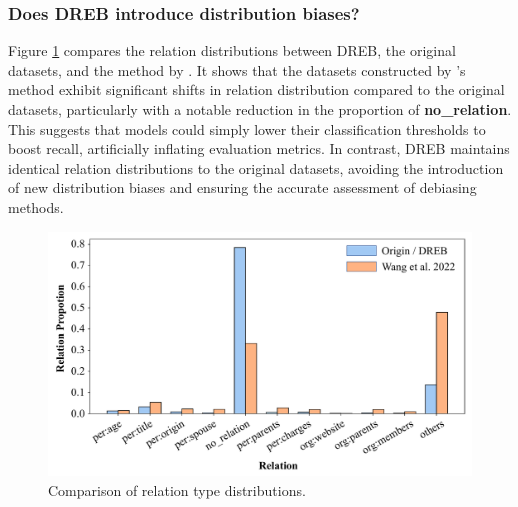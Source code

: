 \documentclass[letterpaper]{article} %
\begin{document}
\subsubsection{Does DREB introduce distribution biases?}
Figure \ref{fig:distribution_bias} compares the relation distributions between DREB, the original datasets, and the method by \cite{wang2022should}. It shows that the datasets constructed by \cite{wang2022should}'s method exhibit significant shifts in relation distribution compared to the original datasets, particularly with a notable reduction in the proportion of \textbf{no\_relation}. This suggests that models could simply lower their classification thresholds to boost recall, artificially inflating evaluation metrics. In contrast, DREB maintains identical relation distributions to the original datasets, avoiding the introduction of new distribution biases and ensuring the accurate assessment of debiasing methods.

\begin{figure}[ht]
    \centering
    \includegraphics[width=\linewidth]{figure/distribution_bias.pdf}
    \caption{Comparison of relation type distributions.}
    \label{fig:distribution_bias}
\end{figure}
\end{document}
